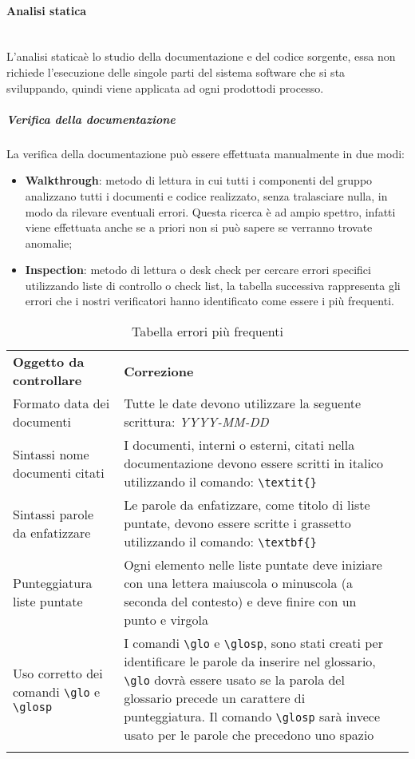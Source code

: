 \paragraph{Analisi statica}\mbox{}\\ [1mm]
L'analisi statica\glosp è lo studio della documentazione e del codice sorgente, essa non richiede l'esecuzione delle singole parti del sistema software che si sta sviluppando, quindi viene applicata ad ogni prodotto\glosp di processo\glo.
\subparagraph*{Verifica della documentazione} 
La verifica della documentazione può essere effettuata manualmente in due modi:
\begin{itemize}
	\item \textbf{Walkthrough}: metodo di lettura in cui tutti i componenti del gruppo analizzano tutti i documenti e codice realizzato, senza tralasciare nulla, in modo da rilevare eventuali errori. Questa ricerca è ad ampio spettro, infatti viene effettuata anche se a priori non si può sapere se verranno trovate anomalie;
	\item \textbf{Inspection}: metodo di lettura o desk check per cercare errori specifici utilizzando liste di controllo o check list, la tabella successiva rappresenta gli errori che i nostri verificatori hanno identificato come essere i più frequenti.
\end{itemize}
\setcounter{table}{0}
\begin{longtable} {
		>{}p{55mm} 
		>{}p{55mm}
		>{}p{0mm}}
	\rowcolor{gray!50}
	\textbf{Oggetto da controllare} & \textbf{Correzione} & \TBstrut \\[2mm]
	Formato data dei documenti & Tutte le date devono utilizzare la seguente scrittura: \textit{YYYY-MM-DD}  &  \TBstrut \\[2mm]
	Sintassi nome documenti citati & I documenti, interni o esterni, citati nella documentazione devono essere scritti in italico utilizzando il comando: \verb|\textit{}|  &  \TBstrut \\[2mm]
	Sintassi parole da enfatizzare & Le parole da enfatizzare, come titolo di liste puntate, devono essere scritte i grassetto utilizzando il comando: \verb|\textbf{}|  &  \TBstrut \\[2mm]
	Punteggiatura liste puntate & Ogni elemento nelle liste puntate deve iniziare con una lettera maiuscola o minuscola (a seconda del contesto) e deve finire con un punto e virgola &  \TBstrut \\[2mm]
	Uso corretto dei comandi \verb|\glo| e \verb|\glosp| & I comandi \verb|\glo| e \verb|\glosp|, sono stati creati per identificare le parole da inserire nel glossario, \verb|\glo| dovrà essere usato se la parola del glossario precede un carattere di punteggiatura. Il comando \verb|\glosp| sarà invece usato per le parole che precedono uno spazio &  \TBstrut \\	[2mm]
	\rowcolor{white}
	\caption{Tabella errori più frequenti}
\end{longtable}

